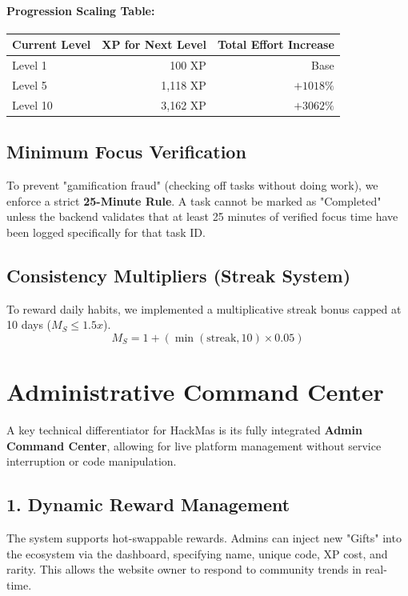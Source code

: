 \documentclass[12pt,a4paper]{article}
\begin{document}
\paragraph{Progression Scaling Table:}
\begin{center}
\begin{tabular}{lrr}
\toprule
\textbf{Current Level} & \textbf{XP for Next Level} & \textbf{Total Effort Increase} \\
\midrule
Level 1 & 100 XP & Base \\
Level 5 & 1,118 XP & $+1018\%$ \\
Level 10 & 3,162 XP & $+3062\%$ \\
\bottomrule
\end{tabular}
\end{center}

\subsection{Minimum Focus Verification}
To prevent "gamification fraud" (checking off tasks without doing work), we enforce a strict \textbf{25-Minute Rule}. A task cannot be marked as "Completed" unless the backend validates that at least 25 minutes of verified focus time have been logged specifically for that task ID.

\subsection{Consistency Multipliers (Streak System)}
To reward daily habits, we implemented a multiplicative streak bonus capped at 10 days ($M_S \leq 1.5x$).
\begin{equation}
M_S = 1 + (\min(\text{streak}, 10) \times 0.05)
\end{equation}

\section{Administrative Command Center}
A key technical differentiator for HackMas is its fully integrated \textbf{Admin Command Center}, allowing for live platform management without service interruption or code manipulation.

\subsection{1. Dynamic Reward Management}
The system supports hot-swappable rewards. Admins can inject new "Gifts" into the ecosystem via the dashboard, specifying name, unique code, XP cost, and rarity. This allows the website owner to respond to community trends in real-time.
\end{document}
